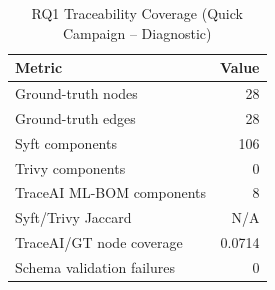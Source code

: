 \begin{table}[htbp]
\caption{RQ1 Traceability Coverage (Quick Campaign -- Diagnostic)}
\label{tab:rq1-coverage}
\centering\small
\begin{tabular}{lr}
\toprule
\textbf{Metric} & \textbf{Value} \\
\midrule
  Ground-truth nodes & 28 \\
  Ground-truth edges & 28 \\
  Syft components & 106 \\
  Trivy components & 0 \\
  TraceAI ML-BOM components & 8 \\
  Syft/Trivy Jaccard & N/A \\
  TraceAI/GT node coverage & 0.0714 \\
  Schema validation failures & 0 \\
\bottomrule
\end{tabular}
\end{table}